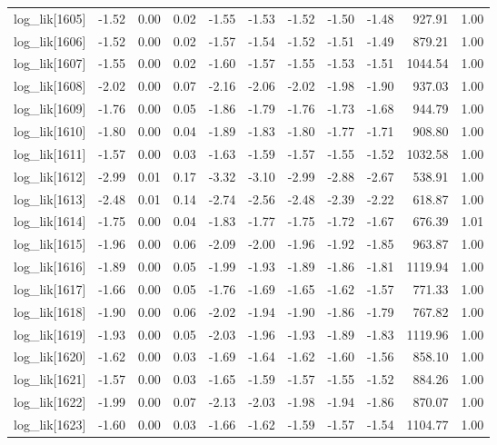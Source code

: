 \begin{table}[ht]
\begin{tabular}{rrrrrrrrrrr}
  log\_lik[1605] & -1.52 & 0.00 & 0.02 & -1.55 & -1.53 & -1.52 & -1.50 & -1.48 & 927.91 & 1.00 \\ 
  log\_lik[1606] & -1.52 & 0.00 & 0.02 & -1.57 & -1.54 & -1.52 & -1.51 & -1.49 & 879.21 & 1.00 \\ 
  log\_lik[1607] & -1.55 & 0.00 & 0.02 & -1.60 & -1.57 & -1.55 & -1.53 & -1.51 & 1044.54 & 1.00 \\ 
  log\_lik[1608] & -2.02 & 0.00 & 0.07 & -2.16 & -2.06 & -2.02 & -1.98 & -1.90 & 937.03 & 1.00 \\ 
  log\_lik[1609] & -1.76 & 0.00 & 0.05 & -1.86 & -1.79 & -1.76 & -1.73 & -1.68 & 944.79 & 1.00 \\ 
  log\_lik[1610] & -1.80 & 0.00 & 0.04 & -1.89 & -1.83 & -1.80 & -1.77 & -1.71 & 908.80 & 1.00 \\ 
  log\_lik[1611] & -1.57 & 0.00 & 0.03 & -1.63 & -1.59 & -1.57 & -1.55 & -1.52 & 1032.58 & 1.00 \\ 
  log\_lik[1612] & -2.99 & 0.01 & 0.17 & -3.32 & -3.10 & -2.99 & -2.88 & -2.67 & 538.91 & 1.00 \\ 
  log\_lik[1613] & -2.48 & 0.01 & 0.14 & -2.74 & -2.56 & -2.48 & -2.39 & -2.22 & 618.87 & 1.00 \\ 
  log\_lik[1614] & -1.75 & 0.00 & 0.04 & -1.83 & -1.77 & -1.75 & -1.72 & -1.67 & 676.39 & 1.01 \\ 
  log\_lik[1615] & -1.96 & 0.00 & 0.06 & -2.09 & -2.00 & -1.96 & -1.92 & -1.85 & 963.87 & 1.00 \\ 
  log\_lik[1616] & -1.89 & 0.00 & 0.05 & -1.99 & -1.93 & -1.89 & -1.86 & -1.81 & 1119.94 & 1.00 \\ 
  log\_lik[1617] & -1.66 & 0.00 & 0.05 & -1.76 & -1.69 & -1.65 & -1.62 & -1.57 & 771.33 & 1.00 \\ 
  log\_lik[1618] & -1.90 & 0.00 & 0.06 & -2.02 & -1.94 & -1.90 & -1.86 & -1.79 & 767.82 & 1.00 \\ 
  log\_lik[1619] & -1.93 & 0.00 & 0.05 & -2.03 & -1.96 & -1.93 & -1.89 & -1.83 & 1119.96 & 1.00 \\ 
  log\_lik[1620] & -1.62 & 0.00 & 0.03 & -1.69 & -1.64 & -1.62 & -1.60 & -1.56 & 858.10 & 1.00 \\ 
  log\_lik[1621] & -1.57 & 0.00 & 0.03 & -1.65 & -1.59 & -1.57 & -1.55 & -1.52 & 884.26 & 1.00 \\ 
  log\_lik[1622] & -1.99 & 0.00 & 0.07 & -2.13 & -2.03 & -1.98 & -1.94 & -1.86 & 870.07 & 1.00 \\ 
  log\_lik[1623] & -1.60 & 0.00 & 0.03 & -1.66 & -1.62 & -1.59 & -1.57 & -1.54 & 1104.77 & 1.00 \\ 

\end{tabular}
\end{table}
